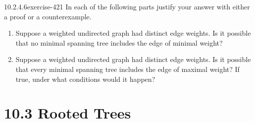 \documentclass[twoside,10pt,]{book}
\numberwithin{equation}{section}
\begin{document}
\begin{divisionsolution}{10.2.4.6}{}{exercise-421}%
\hypertarget{p-3607}{}%
In each of the following parts justify your answer with either a proof or a counterexample.%
\par
\hypertarget{p-3608}{}%
\leavevmode%
\begin{enumerate}[label=(\alph*)]
\item\hypertarget{li-1665}{}\hypertarget{p-3609}{}%
Suppose a weighted undirected graph had distinct edge weights. Is it possible that no minimal spanning tree includes the edge of minimal weight?%
\item\hypertarget{li-1666}{}\hypertarget{p-3610}{}%
Suppose a weighted undirected graph had distinct edge weights. Is it possible that every minimal spanning tree includes the edge of maximal weight? If true, under what conditions would it happen?%
\end{enumerate}
%
\end{divisionsolution}%
\section*{10.3 Rooted Trees}
\end{document}

